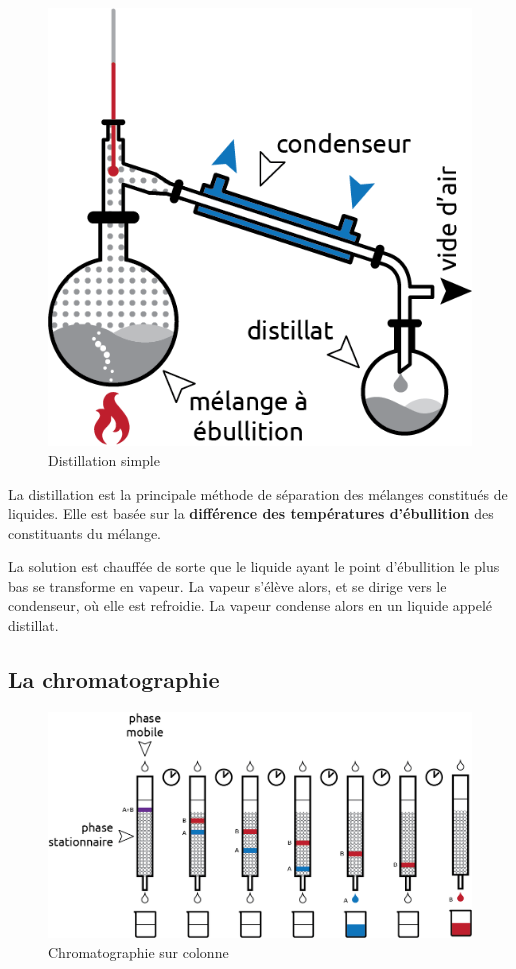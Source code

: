 \documentclass[
  11pt,
  french,
  a4paper,
  openany]{book}
\begin{document}
\begin{figure}

{\centering \includegraphics[width=0.4\linewidth]{images/distillation} 

}

\caption{Distillation simple}\label{fig:distillation}
\end{figure}

La distillation est la principale méthode de séparation des mélanges constitués de liquides. Elle est basée sur la \textbf{différence des températures d'ébullition} des constituants du mélange.

La solution est chauffée de sorte que le liquide ayant le point d'ébullition le plus bas se transforme en vapeur. La vapeur s'élève alors, et se dirige vers le condenseur, où elle est refroidie. La vapeur condense alors en un liquide appelé distillat.

\hypertarget{la-chromatographie}{%
\subsection{La chromatographie}\label{la-chromatographie}}

\begin{figure}

{\centering \includegraphics[width=0.67\linewidth]{images/chromatographie} 

}

\caption{Chromatographie sur colonne}\label{fig:chromatographie}
\end{figure}
\end{document}
